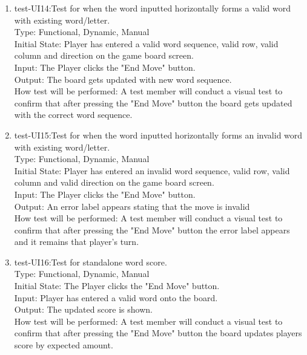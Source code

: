 \documentclass[12pt, titlepage]{article}
\begin{document}
\begin{enumerate}
    \item{test-UI14:Test for when the word inputted horizontally forms a valid word with existing word/letter.\\} %
    Type: Functional, Dynamic, Manual\\
    Initial State: Player has entered a valid word sequence, valid row, valid column and direction on the game board screen.\\
    Input: The Player clicks the "End Move" button.\\
    Output: The board gets updated with new word sequence. \\
    How test will be performed: A test member will conduct a visual test to confirm that after pressing the "End Move" button the board gets updated with the correct word sequence.\\
    
    \item{test-UI15:Test for when the word inputted horizontally forms an invalid word with existing word/letter.\\} %
    Type: Functional, Dynamic, Manual\\
    Initial State: Player has entered an invalid word sequence, valid row, valid column and valid direction on the game board screen.\\
    Input: The Player clicks the "End Move" button.\\
    Output: An error label appears stating that the move is invalid \\
    How test will be performed: A test member will conduct a visual test to confirm that after pressing the "End Move" button the error label appears and it remains that player's turn.\\
    
    \item{test-UI16:Test for standalone word score.\\} %
    Type: Functional, Dynamic, Manual\\
    Initial State: The Player clicks the "End Move" button.\\
    Input: Player has entered a valid word onto the board. \\
    Output: The updated score is shown. \\
    How test will be performed: A test member will conduct a visual test to confirm that after pressing the "End Move" button the board updates players score by expected amount.\\
    

\end{enumerate}
\end{document}

